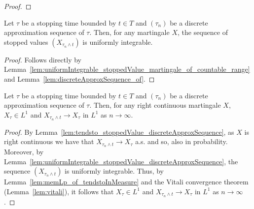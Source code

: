 \begin{proof}
  \leanok
\end{proof}

\begin{lemma}\label{lem:uniformIntegrable_stoppedValue_discreteApproxSequence}
  \leanok
  Let \(\tau\) be a stopping time bounded by \(t \in T\) and \((\tau_n)\) be a discrete approximation sequence of \(\tau\).
  Then, for any martingale \(X\), the sequence of stopped values \((X_{\tau_n \wedge t})\) is uniformly integrable.
\end{lemma}

\begin{proof}
  \leanok
  Follows directly by Lemma~\ref{lem:uniformIntegrable_stoppedValue_martingale_of_countable_range} and Lemma~\ref{lem:discreteApproxSequence_of}.
\end{proof}

\begin{lemma}\label{lem:tendsto_eLpNorm_stoppedValue_discreteApproxSequence}
  \leanok
  Let \(\tau\) be a stopping time bounded by \(t \in T\) and \((\tau_n)\) be a discrete approximation sequence of \(\tau\).
  Then, for any right continuous martingale \(X\), \(X_{\tau} \in L^1\) and \(X_{\tau_n \wedge t} \to X_{\tau}\) in \(L^1\) as \(n \to \infty\).
\end{lemma}

\begin{proof}
  \leanok
  By Lemma~\ref{lem:tendsto_stoppedValue_discreteApproxSequence}, as \(X\) is right continuous we have that \(X_{\tau_n \wedge t} \to X_{\tau}\) a.s. and so,
  also in probability. Moreover, by Lemma~\ref{lem:uniformIntegrable_stoppedValue_discreteApproxSequence}, the sequence \((X_{\tau_n \wedge t})\) is uniformly integrable.
  Thus, by Lemma~\ref{lem:memLp_of_tendstoInMeasure} and the Vitali convergence theorem (Lemma~\ref{lem:vitali}), it
  follows that \(X_{\tau} \in L^1\) and \(X_{\tau_n \wedge t} \to X_{\tau}\) in \(L^1\) as \(n \to \infty\).
\end{proof}

